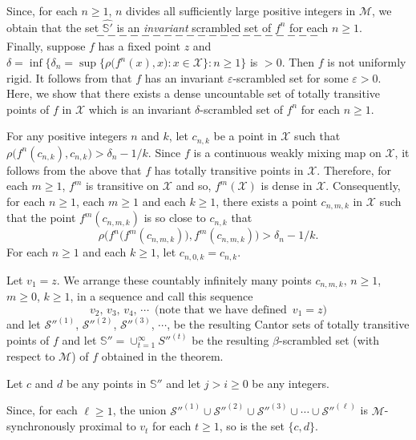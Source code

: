 \documentclass[12pt]{article}
\newcommand{\va}{\varepsilon}
\begin{document}
Since, for each $n \ge 1$, $n$ divides all sufficiently large positive integers in $\mathcal M$, we obtain that the set $\widehat {\mathbb S'}$ is an {\it invariant} scrambled set of $f^n$ for each $n \ge 1$.
$$--------------------$$
\indent Finally, suppose $f$ has a fixed point $z$ and $\delta = \inf \big\{ \delta_n = \sup\{ \rho(f^n(x), x\big): x \in \mathcal X \}: n \ge 1 \big\}$ is $> 0$.  Then $f$ is not uniformly rigid.  It follows from {\bf\cite{fo}} that $f$ has an invariant $\va$-scrambled set for some $\va > 0$.  Here, we show that there exists a dense uncountable set of totally transitive points of $f$ in $\mathcal X$ which is an invariant $\delta$-scrambled set of $f^n$ for each $n \ge 1$.

For any positive integers $n$ and $k$, let $c_{n,k}$ be a point in $\mathcal X$ such that $\rho\big(f^n(c_{n,k}), c_{n,k} \big) > \delta_n - 1/k$.  Since $f$ is a continuous weakly mixing map on $\mathcal X$, it follows from the above that $f$ has totally transitive points in $\mathcal X$.  Therefore, for each $m \ge 1$, $f^m$ is transitive on $\mathcal X$ and so, $f^m(\mathcal X)$ is dense in $\mathcal X$.  Consequently, for each $n \ge 1$, each $m \ge 1$ and each $k \ge 1$, there exists a point $c_{n,m,k}$ in $\mathcal X$ such that the point $f^m(c_{n,m,k})$ is so close to $c_{n,k}$ that 
$$
\rho\big(f^n\big(f^m(c_{n,m,k})\big), f^m(c_{n,m,k})\big) > \delta_n - 1/k.
$$
For each $n \ge 1$ and each $k \ge 1$, let $c_{n,0,k} = c_{n,k}$.

Let $v_1 = z$. We arrange these countably infinitely many points $c_{n,m,k}, \, n \ge 1$, $m \ge 0$, $k \ge 1$, in a sequence and call this sequence 
$$
v_2, \, v_3, \, v_4, \, \cdots \,\,\, \text{(note that we have defined} \,\,\, v_1 = z)
$$
and let $\mathcal S''^{(1)}$, $\mathcal S''^{(2)}$, $\mathcal S''^{(3)}$, $\cdots$, be the resulting Cantor sets of totally transitive points of $f$ and let $\mathbb S'' = \cup_{t = 1}^\infty S''^{(t)}$ be the resulting $\beta$-scrambled set (with respect to $\mathcal M$) of $f$ obtained in the theorem.  

Let $c$ and $d$ be any points in $\mathbb S''$ and let $j > i \ge 0$ be any integers.  

Since, for each $\ell \ge 1$, the union $\mathcal S''^{(1)} \cup \mathcal S''^{(2)} \cup \mathcal S''^{(3)} \cup \cdots \cup \mathcal S''^{(\ell)}$ is $\mathcal M$-synchronously proximal to $v_t$ for each $t \ge 1$, so is the set $\{ c, d \}$.  
\end{document}
